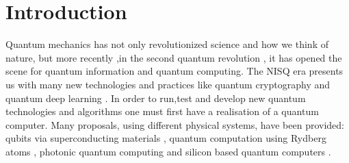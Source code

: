 \documentclass{physics_article}
\date{}
\begin{document}
	\maketitle
	\tableofcontents

	\section{Introduction \label{intro}}
	Quantum mechanics has not only revolutionized science and how we think of nature, but more recently ,in the second quantum revolution \cite{https://doi.org/10.48550/arxiv.quant-ph/0206091}, it has opened the scene for quantum information and quantum computing. The NISQ era \cite{Preskill2018quantumcomputingin} presents us with many new technologies and practices like quantum cryptography \cite{bernstein_buchmann_dahmen_2009} and quantum deep learning \cite{https://doi.org/10.48550/arxiv.1711.02038}. In order to run,test and develop new quantum technologies and algorithms one must first have a realisation of a quantum computer. Many proposals, using different physical systems, have been provided: qubits via superconducting materials \cite{PhysRevLett.85.2208, nakamura_pashkin_tsai_1999}, quantum computation using Rydberg atoms \cite{PhysRevLett.74.4091,PhysRevLett.75.4714}, photonic quantum computing \cite{knill_laflamme_milburn_2001,doi:10.1126/science.abe8770} and silicon based quantum computers \cite{kane_1998,madzik_asaad_youssry_joecker_rudinger_nielsen_young_proctor_baczewski_laucht_et}.
\end{document}
